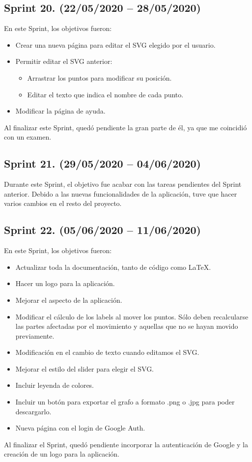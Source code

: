 \subsection{Sprint 20. (22/05/2020 -- 28/05/2020)}
En este Sprint, los objetivos fueron:
\begin{itemize}
	\item Crear una nueva página para editar el SVG elegido por el usuario.
	\item Permitir editar el SVG anterior:
	\begin{itemize}
		\item Arrastrar los puntos para modificar su posición.
		\item Editar el texto que indica el nombre de cada punto.
	\end{itemize}
	\item Modificar la página de ayuda.
\end{itemize}
Al finalizar este Sprint, quedó pendiente la gran parte de él, ya que me coincidió con un examen.

\subsection{Sprint 21. (29/05/2020 -- 04/06/2020)}
Durante este Sprint, el objetivo fue acabar con las tareas pendientes del Sprint anterior. Debido a las nuevas funcionalidades de la aplicación, tuve que hacer varios cambios en el resto del proyecto.

\subsection{Sprint 22. (05/06/2020 -- 11/06/2020)}
En este Sprint, los objetivos fueron:
\begin{itemize}
	\item Actualizar toda la documentación, tanto de código como \LaTeX.
	\item Hacer un logo para la aplicación.
	\item Mejorar el aspecto de la aplicación.
	\item Modificar el cálculo de los labels al mover los puntos. Sólo deben recalcularse las partes afectadas por el movimiento y aquellas que no se hayan movido previamente.
	\item Modificación en el cambio de texto cuando editamos el SVG.
	\item Mejorar el estilo del slider para elegir el SVG.
	\item Incluir leyenda de colores.
	\item Incluir un botón para exportar el grafo a formato .png o .jpg para poder descargarlo.
	\item Nueva página con el login de Google Auth.
\end{itemize}
Al finalizar el Sprint, quedó pendiente incorporar la autenticación de Google y la creación de un logo para la aplicación.

